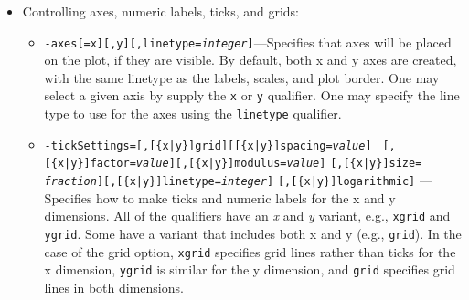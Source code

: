 \begin{itemize}
\begin{itemize}
\begin{itemize}
  \item {\tt -zoom=[\{x|y\}Factor={\em value}][,\{x|p\}Center={\em value}][,\{y|q\}Center={\em
value}]} --- Specifies zoom and pan starting from the scales set by autoscaling or by {\tt -scales}.
A factor less than (greater than) unity zooms out (in).  For each dimension, one may specify the
center of the plot using either the

  \item {\tt -aspectRatio={\em value}} --- Specifies the y/x aspect ratio of the plot.  The value
must be nonzero.  If it is positive, then the desired aspect ratio is obtained by altering the
pspace.  If it is negative, the desired aspect ratio (the absolute value of the value given) is
obtained by altering the data coordinate range.

  \item {\tt -pSpace={\em hMin}{,\em hMax}{,\em vMin}{,\em vMax}}---This option is seldom used, but allows
control of the region of the panel that is mapped to data coordinates, said region being the ``plot space''
or ``pspace''.  The first two coordinates give the horizontal extent, while the second two give the 
vertical extent.  The coordinate values are between 0 and 1.  The defaults are [0.15, 0.9]x[0.15, 0.9].
  \end{itemize}
\item Controlling axes, numeric labels, ticks, and grids:
  \begin{itemize}
  \item {\tt -axes[=x][,y][,linetype={\em integer}]}---Specifies that axes will be placed on the plot,
if they are visible.  By default, both x and y axes are created, with the same linetype as the labels,
scales, and plot border.  One may select a given axis by supply the {\tt x} or {\tt y} qualifier.
One may specify the line type to use for the axes using the {\tt linetype} qualifier.

  \item {\tt -tickSettings=[,[\{x|y\}]grid][[\{x|y\}]spacing={\em value}]} {\tt
[,[\{x|y\}]factor={\em value}][,[\{x|y\}]modulus={\em value}]} {\tt [,[\{x|y\}]size={\em
fraction}][,[\{x|y\}]linetype={\em integer}]} {\tt [,[\{x|y\}]logarithmic]} --- Specifies how to make
ticks and numeric labels for the x and y dimensions. All of the qualifiers have an {\em x} and {\em
y} variant, e.g., {\tt xgrid} and {\tt ygrid}.  Some have a variant that includes both x and y (e.g.,
{\tt grid}).  In the case of the grid option, {\tt xgrid} specifies grid lines rather than ticks for
the x dimension, {\tt ygrid} is similar for the y dimension, and {\tt grid} specifies grid lines in
both dimensions.


\end{itemize}
\end{itemize}
\end{itemize}
